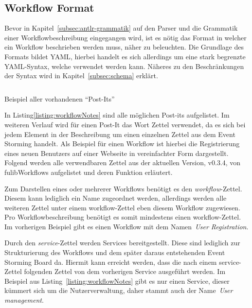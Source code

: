 \subsection{Workflow Format}\label{subsec:workflow-format}
Bevor in Kapitel~\ref{subsec:antlr-grammatik} auf den Parser und die Grammatik einer Workflowbeschreibung eingegangen wird,
ist es nötig das Format in welcher ein Workflow beschrieben werden muss, näher zu beleuchten.
Die Grundlage des Formats bildet \ac{YAML}, hierbei handelt es sich allerdings um eine stark begrenzte YAML-Syntax, welche verwendet werden kann.
Näheres zu den Beschränkungen der Syntax wird in Kapitel~\ref{subsec:schema} erklärt.

\begin{listing}[!ht]
    \inputminted{yaml}{listings/3.1.1/allNotes.es.yaml}
    \caption{Beispiel aller vorhandenen ``Post-Its''}
    \label{listing:workflowNotes}
\end{listing}

In Listing\ref{listing:workflowNotes} sind alle möglichen Post-its aufgelistet.
Im weiteren Verlauf wird für einen Post-It das Wort Zettel verwendet, da es sich bei jedem Element in der Beschreibung um einen einzelnen Zettel aus dem Event Storming handelt.
Als Beispiel für einen Workflow ist hierbei die Registrierung eines neuen Benutzers auf einer Webseite in vereinfachter Form dargestellt.
Folgend werden alle verwendbaren Zettel aus der aktuellen Version, v0.3.4, von fulibWorkflows aufgelistet und deren Funktion erläutert.


Zum Darstellen eines oder mehrerer Workflows benötigt es den \textit{workflow}-Zettel.
Diesem kann lediglich ein Name zugeordnet werden, allerdings werden alle weiteren Zettel unter einem workflow-Zettel eben diesem Workflow zugewiesen.
Pro Workflowbeschreibung benötigt es somit mindestens einen workflow-Zettel.
Im vorherigen Beispiel gibt es einen Workflow mit dem Namen~\textit{User Registration}.


Durch den \textit{service}-Zettel werden Services bereitgestellt.
Diese sind lediglich zur Strukturierung des Workflows und dem später daraus entstehenden Event Storming Board da.
Hiermit kann erreicht werden, dass die nach einem service-Zettel folgenden Zettel von dem vorherigen Service ausgeführt werden.
Im Beispiel aus Listing~\ref{listing:workflowNotes} gibt es nur einen Service, dieser kümmert sich um die Nutzerverwaltung, daher
stammt auch der Name~\textit{User management}.

